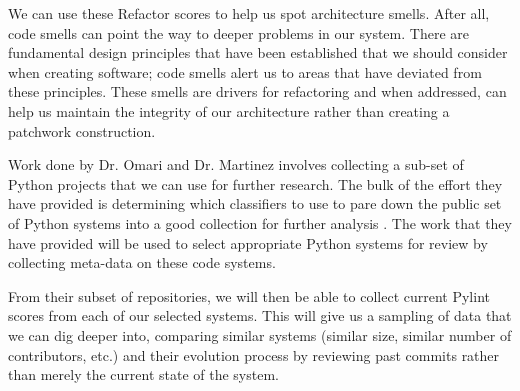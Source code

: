 \documentclass[12pt,conference]{IEEEtran}
\begin{document}
We can use these Refactor scores to help us spot architecture smells. After all, code smells can point the way to deeper problems in our system. There are fundamental design principles that have been established that we should consider when creating software; code smells alert us to areas that have deviated from these principles. These smells are drivers for refactoring and when addressed, can help us maintain the integrity of our architecture rather than creating a patchwork construction.

Work done by Dr. Omari and Dr. Martinez involves collecting a sub-set of Python projects that we can use for further research. The bulk of the effort they have provided is determining which classifiers to use to pare down the public set of Python systems into a good collection for further analysis \cite{omari:2018}. The work that they have provided will be used to select appropriate Python systems for review by collecting meta-data on these code systems.

From their subset of repositories, we will then be able to collect current Pylint scores from each of our selected systems. This will give us a sampling of data that we can dig deeper into, comparing similar systems (similar size, similar number of contributors, etc.) and their evolution process by reviewing past commits rather than merely the current state of the system.

\newpage





\end{document}
